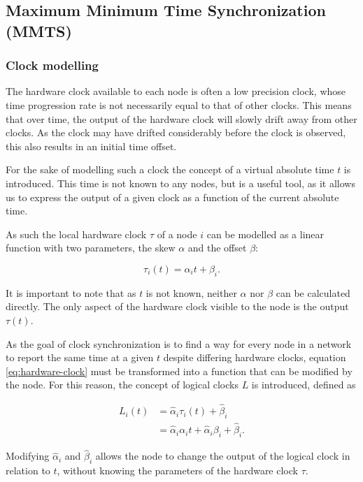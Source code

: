 \documentclass[a4paper,12pt]{article}
\begin{document}
\subsection{Maximum Minimum Time Synchronization (MMTS)}


\subsubsection{Clock modelling}

The hardware clock available to each node is often a low precision clock, whose time progression rate is not necessarily equal to that of other clocks. This means that over time, the output of the hardware clock will slowly drift away from other clocks. As the clock may have drifted considerably before the clock is observed, this also results in an initial time offset.

For the sake of modelling such a clock the concept of a virtual absolute time $t$ is introduced. This time is not known to any nodes, but is a useful tool, as it allows us to express the output of a given clock as a function of the current absolute time.

As such the local hardware clock $\tau$ of a node $i$ can be modelled as a linear function with two parameters, the skew $\alpha$ and the offset $\beta$:

\begin{equation}\label{eq:hardware-clock}
    \tau_i(t) = \alpha_i t + \beta_i.
\end{equation}

It is important to note that as $t$ is not known, neither $\alpha$ nor $\beta$ can be calculated directly. The only aspect of the hardware clock visible to the node is the output $\tau(t)$.

As the goal of clock synchronization is to find a way for every node in a network to report the same time at a given $t$ despite differing hardware clocks, equation \ref{eq:hardware-clock} must be transformed into a function that can be modified by the node. For this reason, the concept of logical clocks $L$ is introduced, defined as

\begin{align}
    L_i(t) &= \hat\alpha_i \tau_i(t) + \hat\beta_i \nonumber \\
        &= \hat\alpha_i \alpha_i t + \hat\alpha_i \beta_i + \hat\beta_i. \label{eq:logical-clock-expanded}
\end{align}

Modifying $\hat\alpha_i$ and $\hat\beta_i$ allows the node to change the output of the logical clock in relation to $t$, without knowing the parameters of the hardware clock $\tau$.
\end{document}
